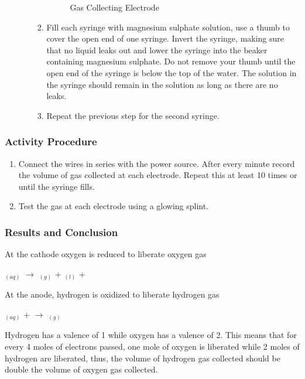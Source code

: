 \begin{enumerate}
\begin{enumerate}
\begin{enumerate}
{\begin{figure}[h]
\begin{center}
\def\svgwidth{200pt}

\caption{Gas Collecting Electrode}
\label{fig:gas collecting electrode}
\end{center}
\end{figure}}

\item{Fill each syringe with magnesium sulphate solution, use a thumb to cover the open end of one syringe. Invert the syringe, making sure that no liquid leaks out and lower the syringe into the beaker containing magnesium sulphate. Do not remove your thumb until the open end of the syringe is below the top of the water. The solution in the syringe should remain in the solution as long as there are no leaks.}
\item{Repeat the previous step for the second syringe.}
\end{enumerate}
\end{enumerate}
\end{enumerate}

\subsubsection*{Activity Procedure}
\begin{enumerate}
\item{Connect the wires in series with the power source. After every minute record the volume of gas collected at each electrode. Repeat this at least 10 times or until the syringe fills.}
\item{Test the gas at each electrode using a glowing splint.}
\end{enumerate}

\subsubsection*{Results and Conclusion}
At the cathode oxygen is reduced to liberate oxygen gas\\
\begin{center}
$_{(aq)}$ $\longrightarrow$ $_{(g)}$ + $_{(l)}$ + \\
\end{center}
At the anode, hydrogen is oxidized to liberate hydrogen gas\\
\begin{center}
$_{(aq)}$ +  $\longrightarrow$ $_{(g)}$\\
\end{center}
Hydrogen has a valence of 1 while oxygen has a valence of 2. This means that for every 4 moles of electrons passed, one mole of oxygen is liberated while 2 moles of hydrogen are liberated, thus, the volume of hydrogen gas collected should be double the volume of oxygen gas collected.

